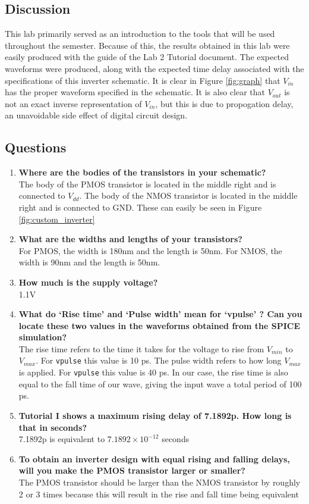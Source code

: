 \documentclass[12pt]{article}
\begin{document}
\subsection{Discussion}
This lab primarily served as an introduction to the tools that will be used throughout the semester. Because of this, the results obtained in this lab were easily produced with the guide of the Lab 2 Tutorial document. The expected waveforms were produced, along with the expected time delay associated with the specifications of this inverter schematic. It is clear in Figure \ref{fig:graph} that $V_{in}$ has the proper waveform specified in the schematic. It is also clear that  $V_{out}$ is not an exact inverse representation of $V_{in}$, but this is due to propogation delay, an unavoidable side effect of digital circuit design.
\subsection{Questions}
\begin{enumerate}
	\item \textbf{Where are the bodies of the transistors in your schematic?} \\
	The body of the PMOS transistor is located in the middle right and is connected to $V_{dd}$. The body of the NMOS transistor is located in the middle right and is connected to GND. These can easily be seen in Figure \ref{fig:custom_inverter}
	
	\item \textbf{What are the widths and lengths of your transistors?}\\
	For PMOS, the width is 180nm and the length is 50nm. For NMOS, the width is 90nm and the length is 50nm.
	
	\item \textbf{How much is the supply voltage?}\\
	1.1V
	
	\item \textbf{What do ‘Rise time’ and ‘Pulse width’ mean for ‘vpulse’ ? Can you locate these two values in the waveforms obtained from the SPICE simulation?} \\
	The rise time refers to the time it takes for the voltage to rise from $V_{min}$ to $V_{max}$. For \texttt{vpulse} this value is 10 ps. The pulse width refers to how long $V_{max}$ is applied. For \texttt{vpulse} this value is 40 ps. In our case, the rise time is also equal to the fall time of our wave, giving the input wave a total period of 100 ps.
	
	\item \textbf{Tutorial I shows a maximum rising delay of 7.1892p. How long is that in seconds?}\\
	7.1892p is equivalent to $7.1892 \times 10^{-12}$ seconds
	
	\item \textbf{To obtain an inverter design with equal rising and falling delays, will you make the PMOS transistor larger or smaller?}\\
	The PMOS transistor should be larger than the NMOS transistor by roughly 2 or 3 times because this will result in the rise and fall time being equivalent 
\end{enumerate}
\end{document}
